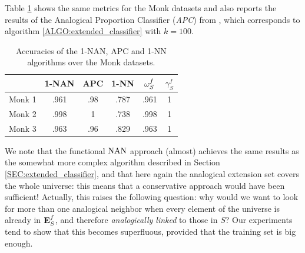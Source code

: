 Table \ref{TAB:monks} shows the same metrics for the Monk datasets and also
reports the results of the Analogical Proportion Classifier (\textit{APC}) from
\cite{MicBayDelJAIR08}, which corresponds to algorithm
\ref{ALGO:extended_classifier} with $k=100$.
\begin{table}
\centering
\begin{tabular}{ l  c  c c  c  c }
\toprule
& 1-NAN  & APC & 1-NN  &  $\omega_{S}^{f}$ & $\gamma_S^f$ \\
\midrule
Monk 1 & .961 & .98 & .787 &   .961    &   1 \\
Monk 2 & .998 & 1 & .738 &    .998    &   1 \\
Monk 3 & .963 & .96 & .829 &   .963    &   1 \\
\bottomrule
\end{tabular}
\caption{Accuracies of the 1-NAN, APC and 1-NN algorithms over the Monk
  datasets.}
  \label{TAB:monks}
\end{table}
We note that the functional $\mbox{NAN}$ approach (almost) achieves the same results
as the somewhat more complex algorithm described in Section
\ref{SEC:extended_classifier}, and that here again the analogical extension set
covers the whole universe: this means that a conservative approach would have
been sufficient! Actually, this raises the following question: why would we
want to look for more than one analogical neighbor when every element of the
universe is already in $\mathbf{E}_{S}^{f}$, and therefore \textit{analogically linked} to
those in $S$? Our experiments tend to show that this becomes superfluous,
provided that the training set is big enough.

